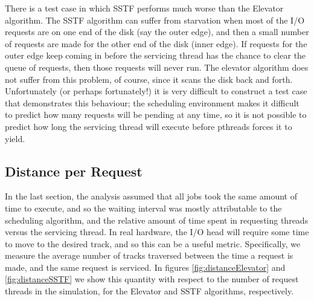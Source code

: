 \documentclass{report}
\begin{document}
%
There is a test case in which SSTF performs much worse than the Elevator algorithm. The
SSTF algorithm can suffer from starvation when most of the I/O requests are on one end of
the disk (say the outer edge), and then a small number of requests are made for the other
end of the disk (inner edge). If
requests for the outer edge keep coming in before the servicing thread has the chance to
clear the queue of requests, then those requests will never run. The elevator algorithm
does not suffer from this problem, of course, since it scans the disk back and forth.
Unfortunately (or perhaps fortunately!) it is very difficult to construct a test case that demonstrates this
behaviour; the scheduling environment makes it difficult to predict how many
requests will be pending at any time, so it is not possible to predict how long the servicing
thread will execute before pthreads forces it to yield.

\subsection{Distance per Request}
In the last section, the analysis assumed that all jobs took the same
amount of time to execute, and so the waiting interval was mostly attributable to the scheduling
algorithm, and the relative amount of time spent in requesting threads versus the
servicing thread. In real hardware, the I/O head will require some time to move to the
desired track, and so this can be a useful metric. Specifically, we measure the average
number of tracks traversed between the time a request is made, and the same request is
serviced. In figures \ref{fig:distanceElevator} and \ref{fig:distanceSSTF} we show this 
quantity with respect to the number of request threads in the simulation, for the
Elevator and SSTF algorithms, respectively.
\end{document}
